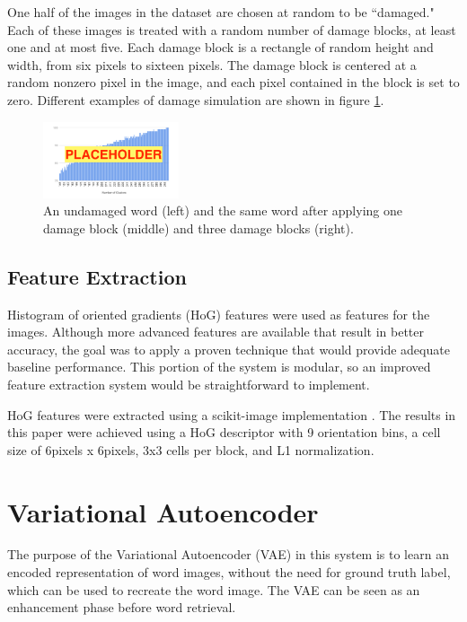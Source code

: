 \documentclass[final]{ukthesis}
\begin{document}
One half of the images in the dataset are chosen at random to be ``damaged." Each of these images is treated with a random number of damage blocks, at least one and at most five. Each damage block is a rectangle of random height and width, from six pixels to sixteen pixels. The damage block is centered at a random nonzero pixel in the image, and each pixel contained in the block is set to zero. Different examples of damage simulation are shown in figure \ref{fig:damage-simulation}.

\begin{figure}[h]
\begin{center}
\includegraphics[width=4cm]{placeholder}
\end{center}
\caption{An undamaged word (left) and the same word after applying one damage block (middle) and three damage blocks (right).}
\label{fig:damage-simulation}
\end{figure}


\subsection{Feature Extraction}
Histogram of oriented gradients (HoG) features were used as features for the images. Although more advanced features are available that result in better accuracy, the goal was to apply a proven technique that would provide adequate baseline performance. This portion of the system is modular, so an improved feature extraction system would be straightforward to implement.

HoG features were extracted using a scikit-image implementation \cite{van2014scikit}. The results in this paper were achieved using a HoG descriptor with 9 orientation bins, a cell size of 6pixels x 6pixels, 3x3 cells per block, and L1 normalization.



%
%
\section{Variational Autoencoder}

The purpose of the Variational Autoencoder (VAE) \cite{kingma2013auto} in this system is to learn an encoded representation of word images, without the need for ground truth label, which can be used to recreate the word image. The VAE can be seen as an enhancement phase before word retrieval.
\end{document}
